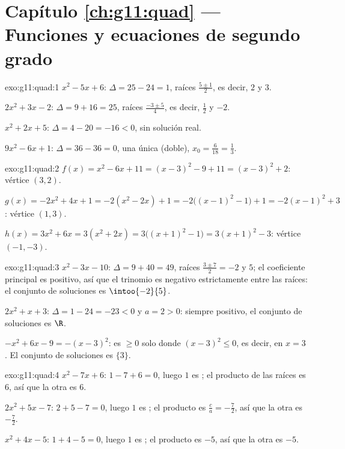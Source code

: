 \section*{Capítulo \ref{ch:g11:quad} --- Funciones y ecuaciones de segundo grado}

\begin{solution}{exo:g11:quad:1}
$x^2-5x+6$: $\Delta = 25 - 24 = 1$, raíces $\frac{5 \pm 1}{2}$, es decir,
$2$ y $3$.

$2x^2+3x-2$: $\Delta = 9 + 16 = 25$, raíces $\frac{-3 \pm 5}{4}$, es
decir, $\frac12$ y $-2$.

$x^2+2x+5$: $\Delta = 4 - 20 = -16 < 0$, sin solución real.

$9x^2-6x+1$: $\Delta = 36 - 36 = 0$, una única  (doble),
$x_0 = \frac{6}{18} = \frac13$.
\end{solution}

\begin{solution}{exo:g11:quad:2}
$f(x) = x^2 - 6x + 11 = (x-3)^2 - 9 + 11 = (x-3)^2 + 2$: vértice $(3, 2)$.

$g(x) = -2x^2+4x+1 = -2(x^2 - 2x) + 1 = -2\bigl((x-1)^2 - 1\bigr) + 1
= -2(x-1)^2 + 3$: vértice $(1, 3)$.

$h(x) = 3x^2 + 6x = 3(x^2 + 2x) = 3\bigl((x+1)^2 - 1\bigr)
= 3(x+1)^2 - 3$: vértice $(-1, -3)$.
\end{solution}

\begin{solution}{exo:g11:quad:3}
$x^2 - 3x - 10$: $\Delta = 9 + 40 = 49$, raíces $\frac{3 \pm 7}{2} = -2$ y
$5$; el coeficiente principal es positivo, así que el trinomio es negativo
estrictamente entre las raíces: el conjunto de soluciones es
$\intoo{-2}{5}$.

$2x^2 + x + 3$: $\Delta = 1 - 24 = -23 < 0$ y $a = 2 > 0$: siempre
positivo, el conjunto de soluciones es $\R$.

$-x^2 + 6x - 9 = -(x-3)^2$: es $\geq 0$ solo donde $(x-3)^2 \leq 0$, es
decir, en $x = 3$. El conjunto de soluciones es $\{3\}$.
\end{solution}

\begin{solution}{exo:g11:quad:4}
$x^2 - 7x + 6$: $1 - 7 + 6 = 0$, luego $1$ es ; el producto de las
raíces es $6$, así que la otra  es $6$.

$2x^2 + 5x - 7$: $2 + 5 - 7 = 0$, luego $1$ es ; el producto es
$\frac{c}{a} = -\frac72$, así que la otra  es $-\frac72$.

$x^2 + 4x - 5$: $1 + 4 - 5 = 0$, luego $1$ es ; el producto es $-5$,
así que la otra  es $-5$.
\end{solution}

